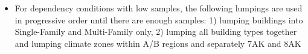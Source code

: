 \begin{itemize}
\item For dependency conditions with low samples, the following lumpings are used in progressive order until there are enough samples: 1) lumping buildings into Single-Family and Multi-Family only,  2) lumping all building types together and lumping climate zones within A/B regions and separately 7AK and 8AK
\end{itemize}
